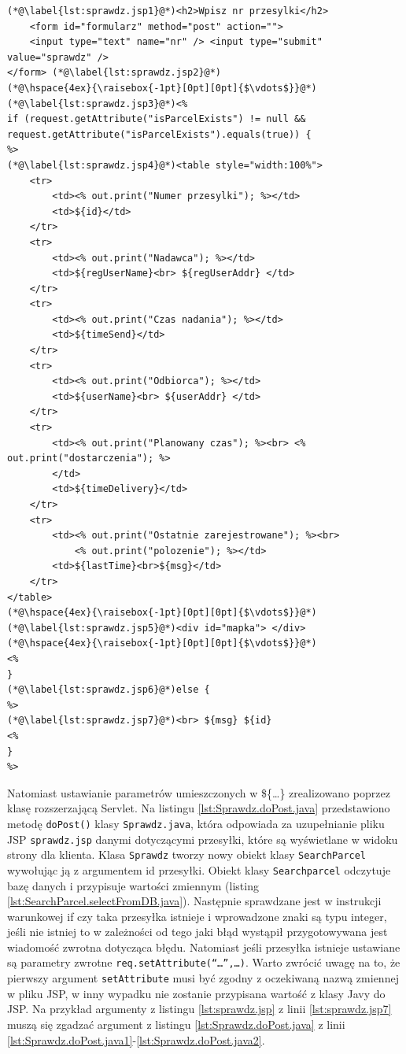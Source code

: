 \documentclass[eng,printmode,oneside]{mgr}
\begin{document}
\begin{lstlisting}[caption=Ciało pliku JavaServlet Pages -
sprawdz.jsp,label=lst:sprawdz.jsp] 
(*@\label{lst:sprawdz.jsp1}@*)<h2>Wpisz nr przesylki</h2> 
	<form id="formularz" method="post" action=""> 
	<input type="text" name="nr" /> <input type="submit" value="sprawdz" />
</form> (*@\label{lst:sprawdz.jsp2}@*)
(*@\hspace{4ex}{\raisebox{-1pt}[0pt][0pt]{$\vdots$}}@*)
(*@\label{lst:sprawdz.jsp3}@*)<%
if (request.getAttribute("isParcelExists") != null &&
request.getAttribute("isParcelExists").equals(true)) {
%>
(*@\label{lst:sprawdz.jsp4}@*)<table style="width:100%">
	<tr>
		<td><% out.print("Numer przesylki"); %></td>
		<td>${id}</td>
	</tr>
	<tr>
		<td><% out.print("Nadawca"); %></td>
		<td>${regUserName}<br> ${regUserAddr} </td>
	</tr>
	<tr>
		<td><% out.print("Czas nadania"); %></td>
		<td>${timeSend}</td>
	</tr>
	<tr>
		<td><% out.print("Odbiorca"); %></td>
		<td>${userName}<br> ${userAddr} </td>
	</tr>
	<tr>
		<td><% out.print("Planowany czas"); %><br> <% out.print("dostarczenia"); %>
		</td>
		<td>${timeDelivery}</td>
	</tr>
	<tr>
		<td><% out.print("Ostatnie zarejestrowane"); %><br>
			<% out.print("polozenie"); %></td>
		<td>${lastTime}<br>${msg}</td>
	</tr>
</table>
(*@\hspace{4ex}{\raisebox{-1pt}[0pt][0pt]{$\vdots$}}@*)
(*@\label{lst:sprawdz.jsp5}@*)<div id="mapka"> </div>
(*@\hspace{4ex}{\raisebox{-1pt}[0pt][0pt]{$\vdots$}}@*)
<%
}
(*@\label{lst:sprawdz.jsp6}@*)else {
%>
(*@\label{lst:sprawdz.jsp7}@*)<br> ${msg} ${id}
<% 
}
%>
\end{lstlisting}

Natomiast ustawianie parametrów umieszczonych w \$\{\ldots\} zrealizowano
poprzez klasę rozszerzającą Servlet. Na listingu \ref{lst:Sprawdz.doPost.java}
przedstawiono metodę \texttt{doPost()} klasy \texttt{Sprawdz.java}, która odpowiada za uzupełnianie
pliku JSP \texttt{sprawdz.jsp} danymi dotyczącymi przesyłki, które są
wyświetlane w widoku strony dla klienta. Klasa \texttt{Sprawdz} tworzy nowy
obiekt klasy \texttt{SearchParcel} wywołując ją z argumentem id przesyłki.
Obiekt klasy \texttt{Searchparcel} odczytuje bazę danych i przypisuje
wartości zmiennym (listing \ref{lst:SearchParcel.selectFromDB.java}). Następnie sprawdzane
jest w instrukcji warunkowej if czy taka przesyłka istnieje i wprowadzone znaki są
typu integer, jeśli nie istniej to w zależności od tego jaki błąd wystąpił
przygotowywana jest wiadomość zwrotna dotycząca błędu. Natomiast jeśli przesyłka
istnieje ustawiane są parametry zwrotne
\texttt{req.setAttribute(``\ldots'',\ldots)}. Warto zwrócić uwagę na to, że
pierwszy argument \texttt{setAttribute} musi być zgodny z oczekiwaną nazwą
zmiennej w pliku JSP, w inny wypadku nie zostanie przypisana wartość z klasy
Javy do JSP. Na przykład argumenty z listingu \ref{lst:sprawdz.jsp} z linii
\ref{lst:sprawdz.jsp7} muszą się zgadzać argument z listingu
\ref{lst:Sprawdz.doPost.java} z linii \ref{lst:Sprawdz.doPost.java1}-\ref{lst:Sprawdz.doPost.java2}.
\end{document}
